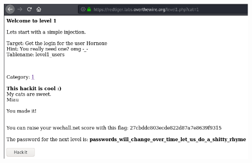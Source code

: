 \documentclass[11pt,letterpaper]{article}
\begin{document}
\begin{center}
\includegraphics[scale=.6]{./Img/sqlmap7.png}
\end{center}~\\~\\~\\
\end{document}
